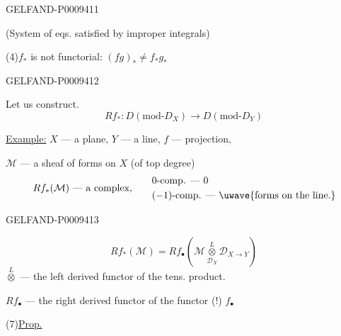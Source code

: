 \begin{GelfandAdjacentEvidence}{GELFAND-P000941}{1}

(System of eqs. satisfied by improper integrals)

(4)\quad $f_*$ is not functorial: \qquad $(fg)_*\ne f_*g_*$
\end{GelfandAdjacentEvidence}
\begin{GelfandAdjacentEvidence}{GELFAND-P000941}{2}


Let us construct.
\begin{equation*}
 Rf_*:D(\text{mod-}D_X)\longrightarrow D(\text{mod-}D_Y)
 \tag{5}
\end{equation*}

\underline{Example:} $X$ --- a plane, $Y$ --- a line, $f$ --- projection,

$\mathcal M$ --- a sheaf of forms on $X$ (of top degree)
\[
 Rf_*(\mathcal M)\text{ --- a complex,}\qquad
 \begin{aligned}
 &0\text{-comp. --- }0\\
 &(-1)\text{-comp. --- }\text{\uwave{forms on the line.}}
 \end{aligned}
\]
\end{GelfandAdjacentEvidence}
\begin{GelfandAdjacentEvidence}{GELFAND-P000941}{3}


\begin{equation*}
 Rf_*(\mathcal M)=Rf_\bullet
 \left(\mathcal M\mathbin{\underset{\mathcal D_X}{\overset L\otimes}}\mathcal D_{X\to Y}\right)
 \tag{6}
\end{equation*}
$\overset L\otimes$ --- the left derived functor of the tens. product.

$Rf_\bullet$ --- the right derived functor of the functor (!) $f_\bullet$

(7)\quad \underline{Prop.}
\end{GelfandAdjacentEvidence}

